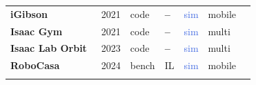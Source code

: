 \documentclass[acmsmall,screen,nonacm]{acmart}
\newcommand{\nn}{\textcolor{BrickRed}{\ding{56}}}         %
\newcommand{\dm}{\textcolor{gray!65}{\textbf{--}}}         %
\newcommand{\dsim}{\textcolor{RoyalBlue}{\textsf{sim}}}
\begin{document}
{\begin{longtable}{@{}p{} c l l c l c@{}}
\hspace{0.6em}\textbf{iGibson}~\cite{igibson} & 2021 & \textsf{code} & \dm & \dsim & \textsf{mobile} & \nn\\
\hspace{0.6em}\textbf{Isaac Gym}~\cite{isaacgym} & 2021 & \textsf{code} & \dm & \dsim & \textsf{multi} & \nn\\
\hspace{0.6em}\textbf{Isaac Lab Orbit}~\cite{orbit} & 2023 & \textsf{code} & \dm & \dsim & \textsf{multi} & \nn\\
\hspace{0.6em}\textbf{RoboCasa}~\cite{robocasa} & 2024 & \textsf{bench} & \textsf{IL} & \dsim & \textsf{mobile} & \nn\\
\addlinespace[2pt]
\end{longtable}
}
  
\end{document}
